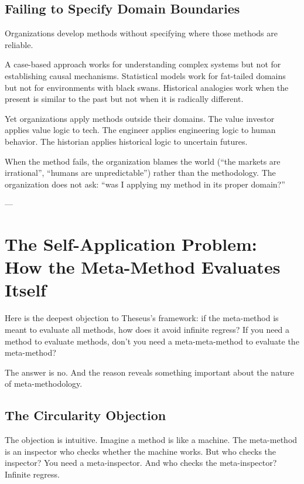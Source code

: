 \documentclass[11pt,letterpaper]{article}
\begin{document}
\subsection*{Failing to Specify Domain Boundaries}

Organizations develop methods without specifying where those methods are reliable.

A case-based approach works for understanding complex systems but not for establishing causal mechanisms. Statistical models work for fat-tailed domains but not for environments with black swans. Historical analogies work when the present is similar to the past but not when it is radically different.

Yet organizations apply methods outside their domains. The value investor applies value logic to tech. The engineer applies engineering logic to human behavior. The historian applies historical logic to uncertain futures.

When the method fails, the organization blames the world (``the markets are irrational'', ``humans are unpredictable'') rather than the methodology. The organization does not ask: ``was I applying my method in its proper domain?''

---

\newpage


\section{The Self-Application Problem: How the Meta-Method Evaluates Itself}

Here is the deepest objection to Theseus's framework: if the meta-method is meant to evaluate all methods, how does it avoid infinite regress? If you need a method to evaluate methods, don't you need a meta-meta-method to evaluate the meta-method?

The answer is no. And the reason reveals something important about the nature of meta-methodology.

\subsection*{The Circularity Objection}

The objection is intuitive. Imagine a method is like a machine. The meta-method is an inspector who checks whether the machine works. But who checks the inspector? You need a meta-inspector. And who checks the meta-inspector? Infinite regress.
\end{document}

